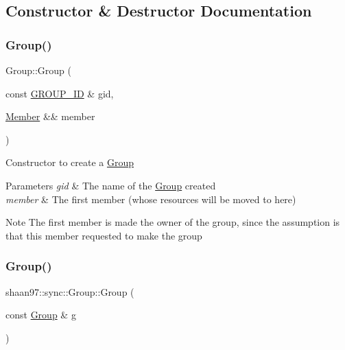 \subsection{Constructor \& Destructor Documentation}
\mbox{\label{classshaan97_1_1sync_1_1_group_a3f71060b1125acf84c8a6038a38caa5a}} 
\subsubsection{\texorpdfstring{Group()}{Group()}\hspace{0.1cm}{\footnotesize\ttfamily [1/3]}}
{\footnotesize\ttfamily Group\+::\+Group (\begin{DoxyParamCaption}\item[{const \hyperlink{namespaceshaan97_1_1sync_a34cebf175d27dfc3d82f24608f7043c1}{G\+R\+O\+U\+P\+\_\+\+ID} \&}]{gid,  }\item[{\hyperlink{classshaan97_1_1sync_1_1_member}{Member} \&\&}]{member }\end{DoxyParamCaption})}

Constructor to create a \hyperlink{classshaan97_1_1sync_1_1_group}{Group} 
\begin{DoxyParams}{Parameters}
{\em gid} & The name of the \hyperlink{classshaan97_1_1sync_1_1_group}{Group} created \\
\hline
{\em member} & The first member (whose resources will be moved to here) \\
\hline
\end{DoxyParams}
\begin{DoxyNote}{Note}
The first member is made the owner of the group, since the assumption is that this member requested to make the group 
\end{DoxyNote}
\mbox{\label{classshaan97_1_1sync_1_1_group_a959091a93465841d564abd3bdfa6a2d5}} 
\subsubsection{\texorpdfstring{Group()}{Group()}\hspace{0.1cm}{\footnotesize\ttfamily [2/3]}}
{\footnotesize\ttfamily shaan97\+::sync\+::\+Group\+::\+Group (\begin{DoxyParamCaption}\item[{const \hyperlink{classshaan97_1_1sync_1_1_group}{Group} \&}]{g }\end{DoxyParamCaption})\hspace{0.3cm}{\ttfamily [delete]}}



